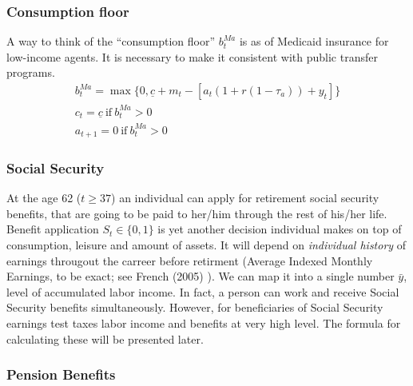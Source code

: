 \documentclass[
10pt, %
a4paper, %
oneside, %
headinclude,footinclude, %
BCOR5mm, %
]{scrartcl}
\begin{document}
\subsubsection{Consumption floor}
A way to think of the ``consumption floor'' $b_t^{Ma}$ is as of Medicaid insurance for low-income agents. It is necessary to make it consistent with public transfer programs.
\begin{eqnarray*}
b_t^{Ma} = \max\{0,\underline{c}+m_t - [a_t(1+r(1-\tau_a)) +y_t]\} \\
c_t = \underline{c} \ \text{if} \ b_t^{Ma} > 0  \\
a_{t+1} = 0 \ \text{if} \ b_t^{Ma} > 0  
\end{eqnarray*}

\subsubsection{Social Security}
At the age 62 ($t\ge37$) an individual can apply for retirement social security benefits, that are going to be paid to her/him through the rest of his/her life. Benefit application $S_t\in\{0,1\}$ is yet another decision individual makes on top of consumption, leisure and amount of assets.
It will depend on \emph{individual history} of earnings througout the carreer before retirment (Average Indexed Monthly Earnings, to be exact; see French (2005) \cite{French2005}). We can map it into a single number $\bar{y}$, level of accumulated labor income.  In fact, a person can work and receive Social Security benefits simultaneously. However, for beneficiaries of Social Security earnings test taxes labor income and benefits at very high level. The formula for calculating these will be presented later.
\subsubsection{Pension Benefits}
\end{document}
